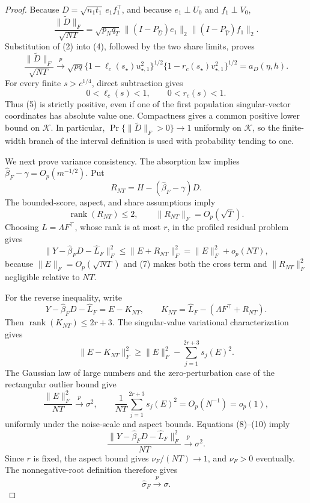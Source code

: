 \documentclass{article}
\begin{document}
\begin{proof}
Because \(D=\sqrt{n_1t_1}\,e_1f_1^{\top}\), and because \(e_1\perp U_0\) and \(f_1\perp V_0\),
\[
 \frac{\|\widetilde D\|_F}{\sqrt{NT}}
 =\sqrt{p_Nq_T}\,
 \|(I-P_{\widehat U})e_1\|_2
 \|(I-P_{\widehat V})f_1\|_2. \tag{4}
\]
Substitution of (2) into (4), followed by the two share limits, proves
\[
 \frac{\|\widetilde D\|_F}{\sqrt{NT}}
 \xrightarrow{p}
 \sqrt{pq}\{1-\ell_c(s_\star)u_{\star,1}^2\}^{1/2}
 \{1-r_c(s_\star)v_{\star,1}^2\}^{1/2}
 =a_D(\eta,h). \tag{5}
\]
For every finite \(s>c^{1/4}\), direct subtraction gives
\[
 0<\ell_c(s)<1,
 \qquad 0<r_c(s)<1. \tag{6}
\]
Thus (5) is strictly positive, even if one of the first population singular-vector coordinates has absolute value one.  Compactness gives a common positive lower bound on \(\mathcal K\).
In particular, \(\Pr\{\|\widetilde D\|_F>0\}\to1\) uniformly on \(\mathcal K\), so the finite-width branch of the interval definition is used with probability tending to one.

We next prove variance consistency.  The absorption law implies
\(\widehat\beta_F-\gamma=O_p(m^{-1/2})\).  Put
\[
 R_{NT}=H-(\widehat\beta_F-\gamma)D.
\]
The bounded-score, aspect, and share assumptions imply
\[
 \operatorname{rank}(R_{NT})\leq2,
 \qquad \|R_{NT}\|_F=O_p(\sqrt T). \tag{7}
\]
Choosing \(L=\Lambda F^{\top}\), whose rank is at most \(r\), in the profiled residual problem gives
\[
 \|Y-\widehat\beta_FD-\widehat L_F\|_F^2
 \leq\|E+R_{NT}\|_F^2
 =\|E\|_F^2+o_p(NT), \tag{8}
\]
because \(\|E\|_F=O_p(\sqrt{NT})\) and (7) makes both the cross term and \(\|R_{NT}\|_F^2\) negligible relative to \(NT\).

For the reverse inequality, write
\[
 Y-\widehat\beta_FD-\widehat L_F=E-K_{NT},
 \qquad
 K_{NT}=\widehat L_F-(\Lambda F^{\top}+R_{NT}).
\]
Then \(\operatorname{rank}(K_{NT})\leq2r+3\).  The singular-value variational characterization gives
\[
 \|E-K_{NT}\|_F^2
 \geq\|E\|_F^2-\sum_{j=1}^{2r+3}s_j(E)^2. \tag{9}
\]
The Gaussian law of large numbers and the zero-perturbation case of the rectangular outlier bound give
\[
 \frac{\|E\|_F^2}{NT}\xrightarrow{p}\sigma^2,
 \qquad
 \frac1{NT}\sum_{j=1}^{2r+3}s_j(E)^2
 =O_p(N^{-1})=o_p(1), \tag{10}
\]
uniformly under the noise-scale and aspect bounds.  Equations (8)--(10) imply
\[
 \frac{\|Y-\widehat\beta_FD-\widehat L_F\|_F^2}{NT}
 \xrightarrow{p}\sigma^2. \tag{11}
\]
Since \(r\) is fixed, the aspect bound gives \(\nu_F/(NT)\to1\), and \(\nu_F>0\) eventually.  The nonnegative-root definition therefore gives
\[
 \widehat\sigma_F\xrightarrow{p}\sigma. \tag{12}
\]


\end{proof}
\end{document}
